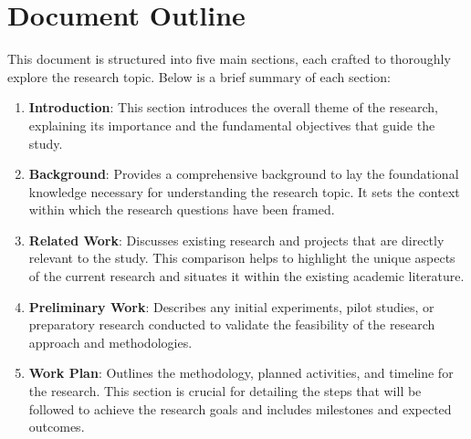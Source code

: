 \section{Document Outline}


This document is structured into five main sections, each crafted to thoroughly explore the research topic. Below is a brief summary of each section:

\begin{enumerate}
    \item \textbf{Introduction}: This section introduces the overall theme of the research, explaining its importance and the fundamental objectives that guide the study.
    
    \item \textbf{Background}: Provides a comprehensive background to lay the foundational knowledge necessary for understanding the research topic. It sets the context within which the research questions have been framed.
    
    \item \textbf{Related Work}: Discusses existing research and projects that are directly relevant to the study. This comparison helps to highlight the unique aspects of the current research and situates it within the existing academic literature.
    
    \item \textbf{Preliminary Work}: Describes any initial experiments, pilot studies, or preparatory research conducted to validate the feasibility of the research approach and methodologies.
    
    \item \textbf{Work Plan}: Outlines the methodology, planned activities, and timeline for the research. This section is crucial for detailing the steps that will be followed to achieve the research goals and includes milestones and expected outcomes.
\end{enumerate}